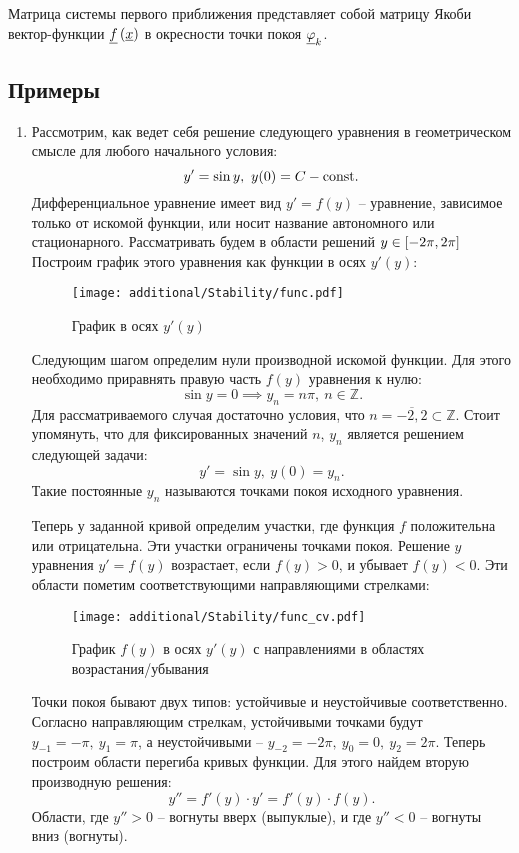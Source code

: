 	Матрица системы первого приближения представляет собой матрицу Якоби вектор-функции $\underline{f}\left( \underline{x} \right)$ в окресности точки покоя $\underline{\varphi}_k$.

	\subsection{Примеры}

		\begin{enumerate}

			\item Рассмотрим, как ведет себя решение следующего уравнения в геометрическом смысле для любого начального условия:
				\[ y' = \sin{y}, ~ y(0) = C - \mathrm{const}. \]
				Дифференциальное уравнение имеет вид $y' = f(y)$ -- уравнение, зависимое только от искомой функции, или носит название автономного или стационарного. Рассматривать будем в области решений $y \in \left[ -2\pi, 2\pi \right]$ Построим график этого уравнения как функции в осях $y'(y)$:
				\begin{figure}[H]
					\centering
					\texttt{[image: additional/Stability/func.pdf]}
					\caption{График в осях $y'(y)$}
				\end{figure}
				Следующим шагом определим нули производной искомой функции. Для этого необходимо приравнять правую часть $f(y)$ уравнения к нулю:
				\[ \sin{y} = 0 \implies y_n = n\pi, ~ n \in \mathbb{Z}. \]
				Для рассматриваемого случая достаточно условия, что $n = \overline{-2, 2} \subset \mathbb{Z}$. Стоит упомянуть, что для фиксированных значений $n$, $y_n$ является решением следующей задачи:
				\[ y' = \sin{y}, ~ y(0) = y_n. \]
				Такие постоянные $y_n$ называются точками покоя исходного уравнения.

				Теперь у заданной кривой определим участки, где функция $f$ положительна или отрицательна. Эти участки ограничены точками покоя. Решение $y$ уравнения $y' = f(y)$ возрастает, если $f(y) > 0$, и убывает $f(y) < 0$. Эти области пометим соответствующими направляющими стрелками:
				\begin{figure}[H]
					\centering
					\texttt{[image: additional/Stability/func\_cv.pdf]}
					\caption{График $f(y)$ в осях $y'(y)$ с направлениями в областях возрастания/убывания}
				\end{figure}

				Точки покоя бывают двух типов: устойчивые и неустойчивые соответственно. Согласно направляющим стрелкам, устойчивыми точками будут $y_{-1} = -\pi, ~ y_{1} = \pi$, а неустойчивыми -- $y_{-2} = -2\pi, ~ y_0 = 0, ~ y_{2} = 2\pi$. Теперь построим области перегиба кривых функции. Для этого найдем вторую производную решения:
				\[ y'' = f'(y) \cdot y' = f'(y) \cdot f(y). \]
				Области, где $y'' > 0$ -- вогнуты вверх (выпуклые), и где $y'' < 0$ -- вогнуты вниз (вогнуты).


\end{enumerate}
